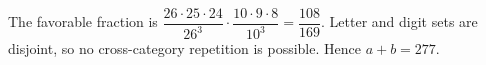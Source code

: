 The favorable fraction is $\dfrac{26\cdot 25\cdot 24}{26^3}\cdot\dfrac{10\cdot 9\cdot 8}{10^3}=\dfrac{108}{169}$. Letter and digit sets are disjoint, so no cross-category repetition is possible. Hence $\boxed{a+b=277}$.
